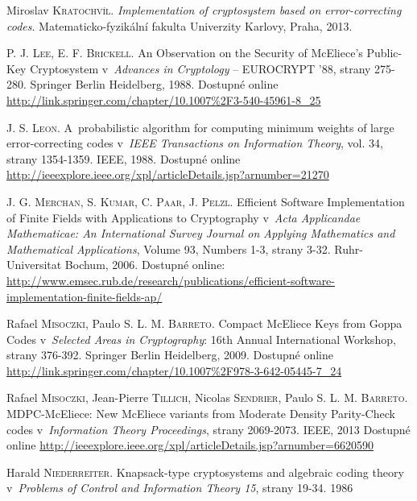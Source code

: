 \documentclass[thesis=M,czech,hidelinks]{FITthesis}[2012/06/26]
\newcommand{\0}{{\textcolor[gray]{0.80}{0}}}
\begin{document}
\begin{thebibliography}{99}
        Miroslav \textsc{Kratochvíl}. \emph{Implementation of cryptosystem
        based on error-correcting codes}. Matematicko-fyzikální fakulta
        Univerzity Karlovy, Praha, 2013.

        P. J. \textsc{Lee}, E. F. \textsc{Brickell}. An Observation on the
        Security of McEliece's Public-Key Cryptosystem v~\emph{Advances in
        Cryptology} -- EUROCRYPT '88, strany 275-280. Springer Berlin
        Heidelberg, 1988. Dostupné online
        \url{http://link.springer.com/chapter/10.1007\%2F3-540-45961-8\_25}

        J. S. \textsc{Leon}. A~probabilistic algorithm for computing minimum
        weights of large error-correcting codes v~\emph{IEEE Transactions on
        Information Theory}, vol. 34, strany 1354-1359. IEEE, 1988. Dostupné
        online
        \url{http://ieeexplore.ieee.org/xpl/articleDetails.jsp?arnumber=21270}

        \vfil
        J. G. \textsc{Merchan}, S. \textsc{Kumar}, C. \textsc{Paar},
        J. \textsc{Pelzl}. Efficient Software Implementation of Finite
        Fields with Applications to Cryptography v~\emph{Acta Applicandae
        Mathematicae: An International Survey Journal on Applying Mathematics
        and Mathematical Applications}, Volume 93, Numbers 1-3, strany  3-32.
        Ruhr-Universitat Bochum, 2006. Dostupné online:
        \url{http://www.emsec.rub.de/research/publications/efficient-software-implementation-finite-fields-ap/}

        Rafael \textsc{Misoczki}, Paulo S. L. M. \textsc{Barreto}. Compact
        McEliece Keys from Goppa Codes v~\emph{Selected Areas in Cryptography}:
        16th Annual International Workshop, strany 376-392. Springer Berlin
        Heidelberg, 2009. Dostupné online
        \url{http://link.springer.com/chapter/10.1007\%2F978-3-642-05445-7\_24}

        Rafael \textsc{Misoczki}, Jean-Pierre \textsc{Tillich}, Nicolas
        \textsc{Sendrier}, Paulo S. L. M. \textsc{Barreto}. MDPC-McEliece: New
        McEliece variants from Moderate Density Parity-Check codes
        v~\emph{Information Theory Proceedings}, strany 2069-2073. IEEE, 2013
        Dostupné online
        \url{http://ieeexplore.ieee.org/xpl/articleDetails.jsp?arnumber=6620590}

        Harald \textsc{Niederreiter}. Knapsack-type cryptosystems and
        algebraic coding theory v~\emph{Problems of Control and Information
        Theory 15}, strany 19-34. 1986


\end{thebibliography}
\end{document}
